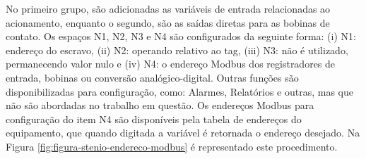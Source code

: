         \begin{figure}[!h]
    	\end{figure}
    	
No primeiro grupo, são adicionadas as variáveis de entrada relacionadas ao acionamento, enquanto o segundo, são as saídas diretas para as bobinas de contato. Os espaços N1, N2, N3 e N4 são configurados da seguinte forma: (i) N1: endereço do escravo, (ii) N2: operando relativo ao tag, (iii) N3: não é utilizado, permanecendo valor nulo e (iv) N4: o endereço Modbus dos registradores de entrada, bobinas ou conversão analógico-digital.
\newpage
Outras funções são disponibilizadas para configuração, como: Alarmes, Relatórios e outras, mas que não são abordadas no trabalho em questão. Os endereços Modbus para configuração do item N4 são disponíveis pela tabela de endereços do equipamento, que quando digitada a variável é retornada o endereço desejado. Na Figura \ref{fig:figura-stenio-endereco-modbus} é representado este procedimento.
    	
        \begin{figure}[!h]
    	\end{figure}
    	

